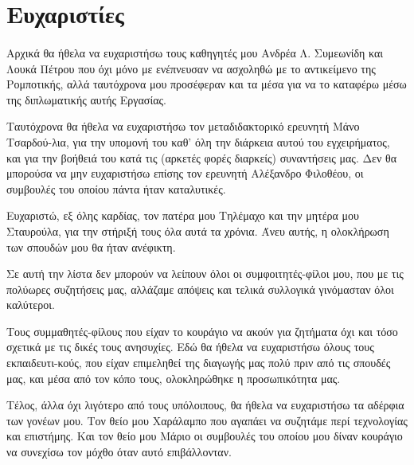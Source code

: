 \section*{Ευχαριστίες}

\paragraph{}Αρχικά θα ήθελα να ευχαριστήσω τους καθηγητές μου Ανδρέα Λ. Συμεωνίδη και Λουκά Πέτρου που όχι μόνο με ενέπνευσαν να ασχοληθώ με το αντικείμενο της Ρομποτικής, αλλά ταυτόχρονα μου προσέφεραν και τα μέσα για να το καταφέρω μέσω της διπλωματικής αυτής Εργασίας. 

Ταυτόχρονα θα ήθελα να ευχαριστήσω τον μεταδιδακτορικό ερευνητή Μάνο Τσαρδού-λια, για την υπομονή του καθ' όλη την διάρκεια αυτού του εγχειρήματος, και για την βοήθειά του κατά τις (αρκετές φορές διαρκείς) συναντήσεις μας. Δεν θα μπορούσα να μην ευχαριστήσω επίσης τον ερευνητή Αλέξανδρο Φιλοθέου, οι συμβουλές του οποίου πάντα ήταν καταλυτικές.

Ευχαριστώ, εξ όλης καρδίας, τον πατέρα μου Τηλέμαχο και την μητέρα μου Σταυρούλα, για την στήριξή τους όλα αυτά τα χρόνια. Άνευ αυτής, η ολοκλήρωση των σπουδών μου θα ήταν ανέφικτη. 

Σε αυτή την λίστα δεν μπορούν να λείπουν όλοι οι συμφοιτητές-φίλοι μου, που με τις πολύωρες συζητήσεις μας, αλλάζαμε απόψεις και τελικά συλλογικά γινόμασταν όλοι καλύτεροι.

Τους συμμαθητές-φίλους που είχαν το κουράγιο να ακούν για ζητήματα όχι και τόσο σχετικά με τις δικές τους ανησυχίες. Εδώ θα ήθελα να ευχαριστήσω όλους τους εκπαιδευτι-κούς, που είχαν επιμεληθεί της διαγωγής μας πολύ πριν από τις σπουδές μας, και μέσα από τον κόπο τους, ολοκληρώθηκε η προσωπικότητα μας.

Τέλος, άλλα όχι λιγότερο από τους υπόλοιπους, θα ήθελα να ευχαριστήσω τα αδέρφια των γονέων μου. Τον θείο μου Χαράλαμπο που αγαπάει να συζητάμε περί τεχνολογίας και επιστήμης. Και τον θείο μου Μάριο οι συμβουλές του οποίου μου δίναν κουράγιο να συνεχίσω τον μόχθο όταν αυτό επιβάλλονταν.

